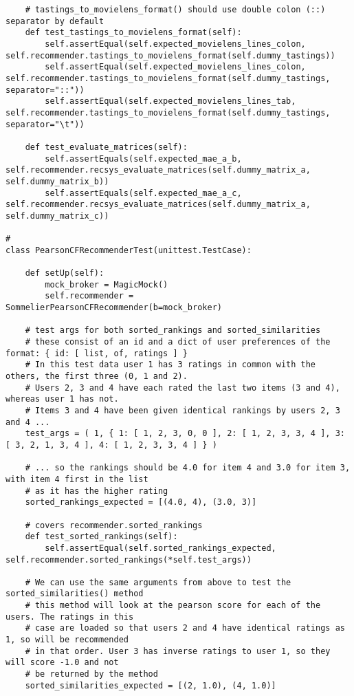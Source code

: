 \begin{verbatim}
    # tastings_to_movielens_format() should use double colon (::) separator by default
    def test_tastings_to_movielens_format(self):
        self.assertEqual(self.expected_movielens_lines_colon, self.recommender.tastings_to_movielens_format(self.dummy_tastings))
        self.assertEqual(self.expected_movielens_lines_colon, self.recommender.tastings_to_movielens_format(self.dummy_tastings, separator="::"))
        self.assertEqual(self.expected_movielens_lines_tab, self.recommender.tastings_to_movielens_format(self.dummy_tastings, separator="\t"))

    def test_evaluate_matrices(self):
        self.assertEquals(self.expected_mae_a_b, self.recommender.recsys_evaluate_matrices(self.dummy_matrix_a, self.dummy_matrix_b))
        self.assertEquals(self.expected_mae_a_c, self.recommender.recsys_evaluate_matrices(self.dummy_matrix_a, self.dummy_matrix_c))

#
class PearsonCFRecommenderTest(unittest.TestCase):

    def setUp(self):
        mock_broker = MagicMock()
        self.recommender = SommelierPearsonCFRecommender(b=mock_broker)

    # test args for both sorted_rankings and sorted_similarities
    # these consist of an id and a dict of user preferences of the format: { id: [ list, of, ratings ] }
    # In this test data user 1 has 3 ratings in common with the others, the first three (0, 1 and 2). 
    # Users 2, 3 and 4 have each rated the last two items (3 and 4), whereas user 1 has not.
    # Items 3 and 4 have been given identical rankings by users 2, 3 and 4 ...
    test_args = ( 1, { 1: [ 1, 2, 3, 0, 0 ], 2: [ 1, 2, 3, 3, 4 ], 3: [ 3, 2, 1, 3, 4 ], 4: [ 1, 2, 3, 3, 4 ] } )

    # ... so the rankings should be 4.0 for item 4 and 3.0 for item 3, with item 4 first in the list
    # as it has the higher rating
    sorted_rankings_expected = [(4.0, 4), (3.0, 3)]

    # covers recommender.sorted_rankings
    def test_sorted_rankings(self):
        self.assertEqual(self.sorted_rankings_expected, self.recommender.sorted_rankings(*self.test_args))

    # We can use the same arguments from above to test the sorted_similarities() method
    # this method will look at the pearson score for each of the users. The ratings in this
    # case are loaded so that users 2 and 4 have identical ratings as 1, so will be recommended
    # in that order. User 3 has inverse ratings to user 1, so they will score -1.0 and not
    # be returned by the method
    sorted_similarities_expected = [(2, 1.0), (4, 1.0)]


\end{verbatim}
